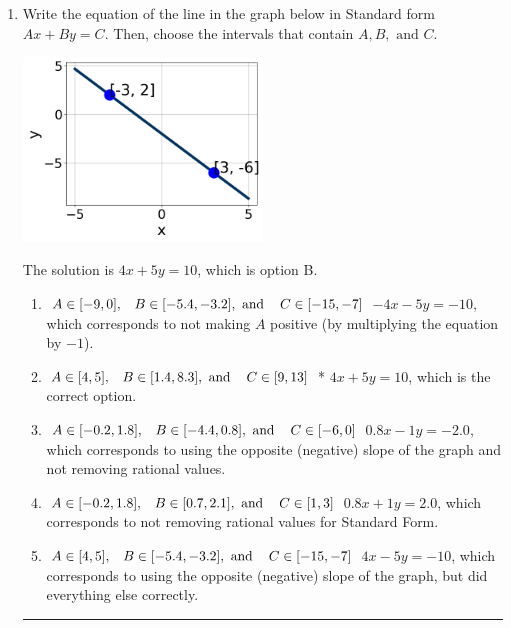 \documentclass{extbook}[14pt]
\newcommand{\litem}[1]{\item #1

\rule{\textwidth}{0.4pt}}
\begin{document}
\begin{enumerate}\litem{
Write the equation of the line in the graph below in Standard form $Ax+By=C$. Then, choose the intervals that contain $A, B, \text{ and } C$.

\begin{center}
    \includegraphics[width=0.5\textwidth]{../Figures/linearGraphToStandardA.png}
\end{center}

The solution is \( 4x + 5y = 10 \), which is option B.\begin{enumerate}[label=\Alph*.]
\item \( A \in [-9, 0], \hspace{3mm} B \in [-5.4, -3.2], \text{ and } \hspace{3mm} C \in [-15, -7] \)
 $-4x - 5y = -10$, which corresponds to not making $A$ positive (by multiplying the equation by $-1$).
\item \( A \in [4, 5], \hspace{3mm} B \in [1.4, 8.3], \text{ and } \hspace{3mm} C \in [9, 13] \)
* $4x + 5y = 10$, which is the correct option.
\item \( A \in [-0.2, 1.8], \hspace{3mm} B \in [-4.4, 0.8], \text{ and } \hspace{3mm} C \in [-6, 0] \)
 $0.8x - 1y = -2.0$, which corresponds to using the opposite (negative) slope of the graph and not removing rational values.
\item \( A \in [-0.2, 1.8], \hspace{3mm} B \in [0.7, 2.1], \text{ and } \hspace{3mm} C \in [1, 3] \)
 $0.8x + 1y = 2.0$, which corresponds to not removing rational values for Standard Form.
\item \( A \in [4, 5], \hspace{3mm} B \in [-5.4, -3.2], \text{ and } \hspace{3mm} C \in [-15, -7] \)
 $4x - 5y = -10$, which corresponds to using the opposite (negative) slope of the graph, but did everything else correctly.
\end{enumerate}

}
\end{enumerate}
\end{document}
